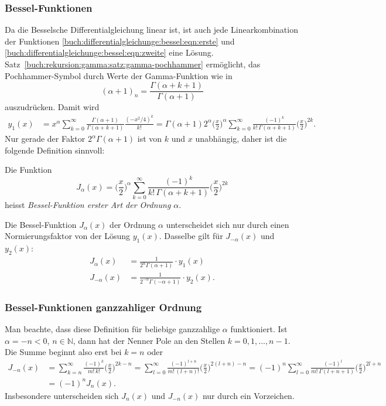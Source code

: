 \subsubsection{Bessel-Funktionen}
Da die Besselsche Differentialgleichung linear ist, ist auch
jede Linearkombination der Funktionen
\eqref{buch:differentialgleichunge:bessel:eqn:erste}
und
\eqref{buch:differentialgleichunge:bessel:eqn:zweite}
eine Lösung.
Satz~\ref{buch:rekursion:gamma:satz:gamma-pochhammer}
ermöglicht, das Pochhammer-Symbol durch Werte der Gamma-Funktion
wie in
\[
(\alpha+1)_n = \frac{\Gamma(\alpha+k+1)}{\Gamma(\alpha+1)}
\]
auszudrücken.
Damit wird
\begin{align}
y_1(x)
&=
x^\alpha
\sum_{k=0}^\infty
\frac{\Gamma(\alpha+1)}{\Gamma(\alpha+k+1)}
\frac{(-x^2/4)^k}{k!}
=
\Gamma(\alpha+1) 2^{\alpha}
\biggl(\frac{x}{2}\biggr)^\alpha
\sum_{k=0}^\infty
\frac{(-1)^k}{k!\,\Gamma(\alpha+k+1)} \biggl(\frac{x}{2}\biggr)^{2k}.
\label{buch:differentialgleichungen:bessel:normierungsgleichung}
\end{align}
Nur gerade der Faktor $2^\alpha\Gamma(\alpha+1)$ ist von $k$ und $x$ 
unabhängig, daher ist die folgende Definition sinnvoll:

\begin{definition}
\label{buch:differentialgleichungen:bessel:definition}
Die Funktion
\[
J_{\alpha}(x)
=
\biggl(\frac{x}{2}\biggr)^\alpha
\sum_{k=0}^\infty
\frac{(-1)^k}{k!\,\Gamma(\alpha+k+1)}
\biggl(\frac{x}{2}\biggr)^{2k}
\]
heisst {\em Bessel-Funktion erster Art der Ordnung $\alpha$}.
%
\end{definition}

Die Bessel-Funktion $J_\alpha(x)$ der Ordnung $\alpha$ unterscheidet sich
nur durch einen Normierungsfaktor von der Lösung $y_1(x)$.
Dasselbe gilt für $J_{-\alpha}(x)$ und $y_2(x)$:
\begin{align*}
J_{\alpha}(x)
&=
\frac{1}{2^\alpha\Gamma(\alpha+1)}
\cdot
y_1(x)
\\
J_{-\alpha}(x)
&=
\frac{1}{2^{-\alpha}\Gamma(-\alpha+1)}
\cdot
y_2(x).
\end{align*}

%
%
\subsubsection{Bessel-Funktionen ganzzahliger Ordnung}
Man beachte, dass diese Definition für beliebige ganzzahlige 
$\alpha$ funktioniert.
Ist $\alpha=-n<0$, $n\in\mathbb{N}$, dann hat der Nenner Pole 
an den Stellen $k=0,1,\dots,n-1$.
Die Summe beginnt also erst bei $k=n$ oder
\begin{align*}
J_{-n}(x)
&=
\sum_{k=n}^\infty \frac{(-1)^k}{m!\,k!}\biggl(\frac{x}{2}\biggr)^{2k-n}
=
\sum_{l=0}^\infty
\frac{(-1)^{l+n}}{m!\,(l+n)!}\biggl(\frac{x}{2}\biggr)^{2(l+n)-n}
=
(-1)^n
\sum_{l=0}^\infty
\frac{(-1)^l}{m!\,\Gamma(l+n+1)}\biggl(\frac{x}{2}\biggr)^{2l+n}
\\
&=
(-1)^n
J_{n}(x).
\end{align*}
Insbesondere unterscheiden sich $J_n(x)$ und $J_{-n}(x)$ nur durch
ein Vorzeichen.

